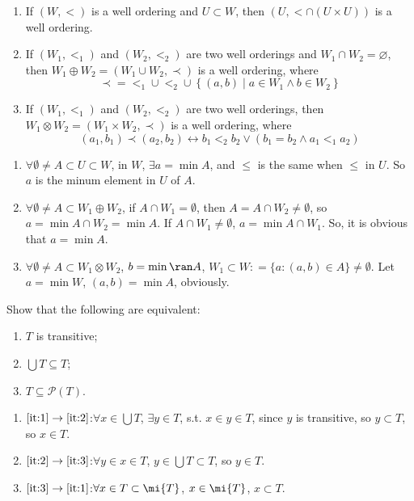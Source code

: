 \documentclass{ctexart}
\begin{document}
\begin{problem}
\begin{enumerate}
\item If $(W,<)$ is a well ordering and $U \subset W$, then $(U,<\cap(U \times U))$ is a well ordering.
\item
If $\left(W_1,<_1\right)$ and $\left(W_2,<_2\right)$ are two well orderings and $W_1 \cap W_2=\varnothing$, then $W_1 \oplus W_2=\left(W_1 \cup W_2, \prec\right)$ is a well ordering, where
$$
\prec=<_1 \cup<_2 \cup\left\{(a, b) \mid a \in W_1 \wedge b \in W_2\right\}
$$
\item
If $\left(W_1,<_1\right)$ and $\left(W_2,<_2\right)$ are two well orderings, then $W_1 \otimes W_2=\left(W_1 \times W_2, \prec\right)$ is a well ordering, where
$$
\left(a_1, b_1\right) \prec\left(a_2, b_2\right) \leftrightarrow b_1<_2 b_2 \vee\left(b_1=b_2 \wedge a_1<_1 a_2\right)
$$
\end{enumerate}
\end{problem}
\begin{solution}
    \begin{enumerate}
        \item $\forall \emptyset \neq A\subset U\subset W$, in $W$, $\exists a=\min A$, and $\le$ is the same when $\le$ in $U$. So $a$ is the minum element in $U$ of $A$.
        \item $\forall \emptyset \neq A\subset W_1\oplus W_2$, if $A\cap W_1=\emptyset$, then $A=A\cap W_2\neq\emptyset$, so $a=\min A\cap W_2=\min A$. If $A\cap W_1\neq\emptyset$, $a=\min A\cap W_1$. So, it is obvious that $a=\min A$.
        \item $\forall \emptyset \neq A\subset W_1\otimes W_2$, $b=\min \ran A$, $W_1\subset W: =\{a:(a,b)\in A\}\neq \emptyset$. Let $a=\min W$, $(a,b)=\min A$, obviously.
    \end{enumerate}
\end{solution}


\begin{problem}
Show that the following are equivalent:
\begin{enumerate}[ref=\theproblem.\arabic*]
\item\label{it:1} $T$ is transitive;
\item\label{it:2}$\bigcup T \subseteq T$;
\item\label{it:3} $T \subseteq \mathscr{P}(T)$.
\end{enumerate}
\end{problem}
\begin{solution}
    \begin{enumerate}
        \item $\Cref{it:1}\to\Cref{it:2}$:$\forall x\in \bigcup T$, $\exists y \in T$, s.t. $x\in y\in T$, since $y$ is transitive, so $y\subset T$, so $x\in T$.
        \item $\Cref{it:2}\to\Cref{it:3}$:$\forall y\in x\in T$, $y\in\bigcup T\subset T$, so $y\in T$.
        \item $\Cref{it:3}\to\Cref{it:1}$:$\forall x\in T\subset \mi{T}$, $x\in\mi{T}$, $x\subset T$. 
    \end{enumerate}
   
\end{solution}
\end{document}
